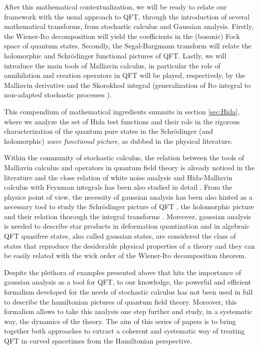 \documentclass[12pt]{article}%
\begin{document}
  After this mathematical contextualization, we will be ready  to relate our framework with the usual approach to QFT, through the introduction of several mathematical transforms,  from stochastic calculus and Gaussian analysis. Firstly, the Wiener-Ito decomposition will yield the coefficients in the (bosonic) Fock space of quantum states. Secondly, the Segal-Bargmann transform will relate the holomorphic and Schrödinger functional pictures of QFT. Lastly,  we will introduce the main tools of Malliavin calculus, in particular the  role of  annihilation and creation operators in QFT will be played, respectively, by the  Malliavin derivative and the Skorokhod integral (generalization of Ito integral to non-adapted stochastic processes \cite{Nunno2009}).


This compendium of mathematical ingredients summits in section \ref{sec:Hida}, where we analyze the set of Hida test functions and their role in the rigorous characterization of the quantum pure states in the Schrödinger (and holomorphic) \textit{wave functional picture},  as dubbed in the physical literature.




Within the community of stochastic calculus, the relation between the tools of Malliavin calculus and operators in quantum field theory is already noticed in the literature \cite{henry-labordere2009} and  the close relation of white noise analysis and Hida-Malliavin calculus with Feynman integrals has been also studied  in detail \cite{Hida1993,Wester2003}.  From the physics point of view, the necessity of gaussian analysis has been also hinted as a necessary tool to study the Schrödinger picture of QFT \cite{Corichi2004}, the holomorphic picture \cite{Oeckl2012a} and their relation thorough the integral transforms \cite{Oeckl2012}. Moreover, gaussian analysis is needed to describe star products in  deformation quantization \cite{dito1990} and in algebraic QFT  quasifree states, also called gaussian states,  are considered the class of states that reproduce the desiderable physical properties of a theory \cite{Brunetti2015} and they can be easily related with the wick order of the Wiener-Ito decomposition theorem.

Despite the plethora of examples presented above that hits the importance of gaussian analysis as a tool for QFT, to our knowledge, the powerful and efficient formalism developed for the needs of stochastic calculus has not been used in full to describe the hamiltonian pictures of quantum field theory. Moreover, this formalism allows to take this analysis one step further and study, in a systematic way, the dynamics of the theory. The aim of this series of papers is to bring together both approaches to extract a coherent and systematic way  of treating QFT in curved spacetimes from the Hamiltonian perspective. 
\end{document}

